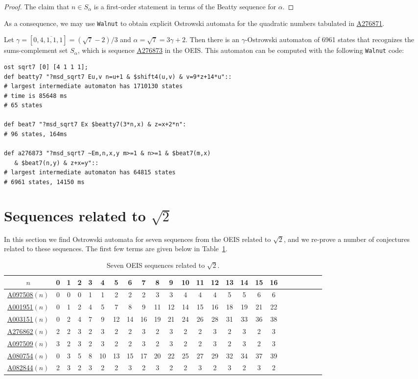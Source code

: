 \documentclass[12pt,reqno]{article}
\newcommand{\seqnum}[1]{\href{https://oeis.org/#1}{\rm \underline{#1}}}
\begin{document}
\begin{proof}
The claim that $n \in S_{\alpha}$ is a first-order statement in terms of the Beatty sequence for $\alpha$.
\end{proof}

As a consequence, we may use {\tt Walnut} to obtain
explicit Ostrowski automata for the quadratic
numbers tabulated in \seqnum{A276871}.

\begin{example}
    Let $\gamma = [0,\overline{4,1,1,1}] = (\sqrt{7}-2)/3$
and $\alpha = \sqrt{7} = 3\gamma + 2$.   Then there is an
$\gamma$-Ostrowski automaton of 6961 states that recognizes the sums-complement set $S_{\alpha}$, which is
sequence \seqnum{A276873} in the OEIS.  This automaton can be computed with the following {\tt Walnut} code:
\begin{verbatim}
ost sqrt7 [0] [4 1 1 1];
def beatty7 "?msd_sqrt7 Eu,v n=u+1 & $shift4(u,v) & v=9*z+14*u"::
# largest intermediate automaton has 1710130 states
# time is 85648 ms
# 65 states

def beat7 "?msd_sqrt7 Ex $beatty7(3*n,x) & z=x+2*n":
# 96 states, 164ms

def a276873 "?msd_sqrt7 ~Em,n,x,y m>=1 & n>=1 & $beat7(m,x) 
   & $beat7(n,y) & z+x=y"::
# largest intermediate automaton has 64815 states
# 6961 states, 14150 ms
\end{verbatim}
\end{example}

\section{Sequences related to \texorpdfstring{$\sqrt{2}$}{sqrt(2)}}
\label{sec12}

In this section we find Ostrowski automata
for seven sequences from the OEIS related to $\sqrt{2}$, and we re-prove a number of conjectures related to these sequences.
The first few terms are given below in
Table~\ref{sqrt2}.
\begin{table}[H]
    \centering
    \begin{tabular}{c|ccccccccccccccccccccccc}
     $n$ &   0& 1& 2& 3& 4& 5& 6& 7& 8& 9&10&11&12&13&14&15&16\\
     \hline
\seqnum{A097508}$(n)$ & 0& 0& 0& 1& 1& 2& 2& 2& 3& 3& 4& 4& 4& 5& 5& 6 & 6\\
 \seqnum{A001951}$(n)$ & 0& 1& 2& 4& 5& 7& 8& 9&11&12&14&15&16&18&19&21&22\\
 \seqnum{A003151}$(n)$ & 0& 2& 4& 7& 9&12&14&16&19&21&24&26&28&31&33&36&38\\
\seqnum{A276862}$(n)$ & 2& 2& 3& 2& 3& 2& 2& 3& 2& 3& 2& 2& 3& 2& 3& 2& 3\\
\seqnum{A097509}$(n)$ & 3& 2& 3& 2& 3& 2& 2& 3& 2& 3& 2& 2& 3& 2& 3& 2& 3 \\
\seqnum{A080754}$(n)$ & 0& 3& 5& 8&10&13&15&17&20&22&25&27&29&32&34&37&39\\
\seqnum{A082844}$(n)$ & 2&3&2&3&2&2&3&2&3&2&2&3&2&3&2&3&2\\
    \end{tabular}
    \caption{Seven OEIS sequences related to $\sqrt{2}$.}
    \label{sqrt2}
\end{table}
\end{document}
